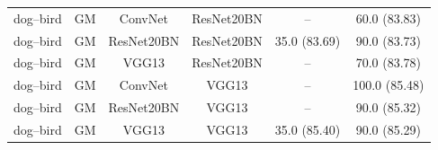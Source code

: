 \begin{table}[t]
{\begin{tabular}{llcccc}
\addlinespace
dog--bird & GM &
ConvNet & ResNet20BN & -- & 60.0 \small{(83.83)} \\
dog--bird & GM &
ResNet20BN & ResNet20BN & 35.0 \small{(83.69)} & 90.0 \small{(83.73)} \\
dog--bird & GM &
VGG13 & ResNet20BN & -- & 70.0 \small{(83.78)} \\

\addlinespace
dog--bird & GM &
ConvNet & VGG13 & -- & 100.0 \small{(85.48)} \\
dog--bird & GM &
ResNet20BN & VGG13 & -- & 90.0 \small{(85.32)} \\
dog--bird & GM &
VGG13 & VGG13 & 35.0 \small{(85.40)} & 90.0 \small{(85.29)} \\

\bottomrule
\end{tabular}
}
\end{table}
